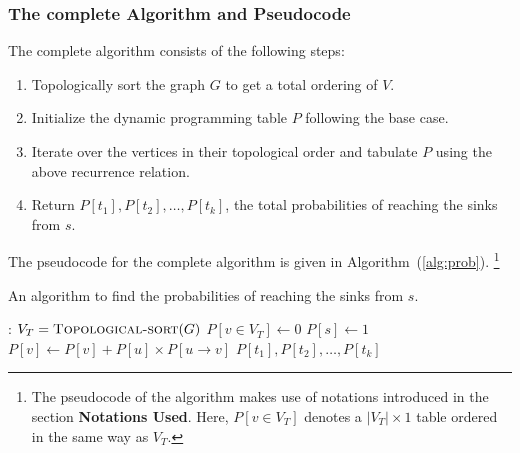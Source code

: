 \documentclass[12pt]{report}
\begin{document}
    \subsubsection*{The complete Algorithm and Pseudocode}
    The complete algorithm consists of the following steps:
    \begin{enumerate}
        \item Topologically sort the graph $G$ to get a total ordering of $V$.
        \item Initialize the dynamic programming table $P$ following the base case.
        \item Iterate over the vertices in their topological order and tabulate $P$ using the above recurrence relation.
        \item Return $P[t_{1}], P[t_{2}], \dots, P[t_{k}]$, the total probabilities of reaching the sinks from $s$.
    \end{enumerate}
    The pseudocode for the complete algorithm is given in Algorithm~(\ref{alg:prob}).
    \footnote{
        The pseudocode of the algorithm makes use of notations introduced in the section \textbf{Notations Used}.
        Here, $P[v \in V_{T}]$ denotes a $|V_{T}| \times 1$ table ordered in the same way as $V_{T}$.
    }

    \begin{algorithm}
        \caption{An algorithm to find the probabilities of reaching the sinks from $s$.}
        \label{alg:prob}
        \begin{algorithmic}[1]
            :
                \State $V_{T} = \Call{Topological-sort}{G}$
                \State $P[v \in V_{T}] \gets 0$
                \State $P[s] \gets 1$
                        \State $P[v] \gets P[v] + P[u] \times P[u \to v]$
                    \EndFor
                \EndFor
                \State \Return $P[t_{1}], P[t_{2}], \dots, P[t_{k}]$
            \EndProcedure
        \end{algorithmic}
    \end{algorithm}
\end{document}
